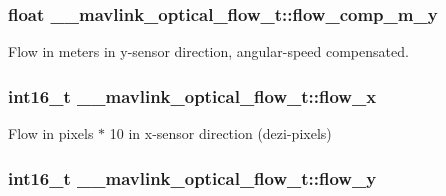 \hypertarget{struct____mavlink__optical__flow__t_a2e39bcd7b74a5c660d1684c8e44e2cca}{
\subsubsection[{flow\+\_\+comp\+\_\+m\+\_\+y}]{\setlength{\rightskip}{0pt plus 5cm}float \+\_\+\+\_\+mavlink\+\_\+optical\+\_\+flow\+\_\+t\+::flow\+\_\+comp\+\_\+m\+\_\+y}}\label{struct____mavlink__optical__flow__t_a2e39bcd7b74a5c660d1684c8e44e2cca}


Flow in meters in y-\/sensor direction, angular-\/speed compensated. 

\hypertarget{struct____mavlink__optical__flow__t_a1e1332d4eb9a84f38d32af8f32ed8c10}{
\subsubsection[{flow\+\_\+x}]{\setlength{\rightskip}{0pt plus 5cm}int16\+\_\+t \+\_\+\+\_\+mavlink\+\_\+optical\+\_\+flow\+\_\+t\+::flow\+\_\+x}}\label{struct____mavlink__optical__flow__t_a1e1332d4eb9a84f38d32af8f32ed8c10}


Flow in pixels $\ast$ 10 in x-\/sensor direction (dezi-\/pixels) 

\hypertarget{struct____mavlink__optical__flow__t_aaf2884728b3ae06ec464c9cf2f8ce1c2}{
\subsubsection[{flow\+\_\+y}]{\setlength{\rightskip}{0pt plus 5cm}int16\+\_\+t \+\_\+\+\_\+mavlink\+\_\+optical\+\_\+flow\+\_\+t\+::flow\+\_\+y}}\label{struct____mavlink__optical__flow__t_aaf2884728b3ae06ec464c9cf2f8ce1c2}


